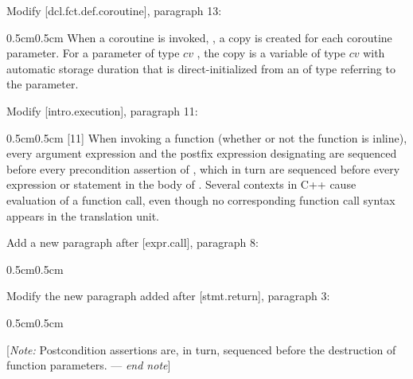 Modify [dcl.fct.def.coroutine], paragraph 13:
\begin{adjustwidth}{0.5cm}{0.5cm}
When a coroutine is invoked, , a copy is created for each coroutine parameter. For a parameter  of type $cv$ , the copy is a variable of type $cv$  with automatic storage duration that is direct-initialized from an  of type  referring to the parameter.

\end{adjustwidth}

Modify [intro.execution], paragraph 11:

\begin{adjustwidth}{0.5cm}{0.5cm}
[11]  When invoking a function  (whether or not the function is inline),
every argument expression and the postfix expression designating  are
sequenced before every precondition assertion of , which in turn are sequenced before
every expression or statement in the body of
.
Several contexts in C++ cause evaluation of a function call, even though no
corresponding function call syntax appears in the translation unit.
\end{adjustwidth}

Add a new paragraph after [expr.call], paragraph 8:

\begin{adjustwidth}{0.5cm}{0.5cm}
\end{adjustwidth}

Modify the new paragraph added after [stmt.return], paragraph 3:

\begin{adjustwidth}{0.5cm}{0.5cm}

[\emph{Note:} Postcondition assertions are, in turn, sequenced before the destruction of function parameters. --- \emph{end note}]

\end{adjustwidth}

